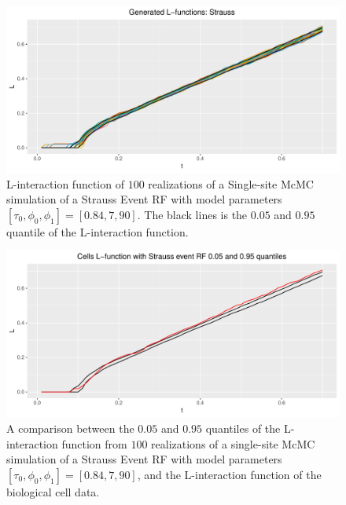 \begin{figure}
    \centering
    \includegraphics[scale=0.65]{figures/gen_strauss_l.pdf}
    \caption{L-interaction function of $100$ realizations of a Single-site McMC simulation of a Strauss Event RF with model parameters $[\tau_0,\phi_0,\phi_1] = [0.84,7,90]$. The black lines is the $0.05$ and $0.95$ quantile of the L-interaction function.}
    \label{fig:gen_strauss_l}
\end{figure}

\begin{figure}
    \centering
    \includegraphics[scale=0.65]{figures/strauss_quant1.pdf}
    \caption{A comparison between the $0.05$ and $0.95$ quantiles of the L-interaction function from $100$ realizations of a single-site McMC simulation of a Strauss Event RF with model parameters $[\tau_0,\phi_0,\phi_1] = [0.84,7,90]$, and the L-interaction function of the biological cell data.}
    \label{fig:strauss_quant1}
\end{figure}

